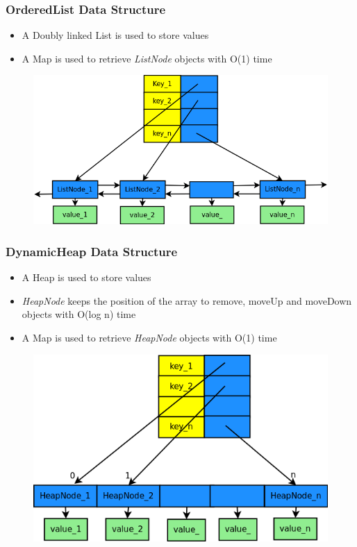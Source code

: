 \documentclass{beamer}
\begin{document}
\begin{frame}
\frametitle{OrderedList Data Structure}

\begin{itemize}
        \item A Doubly linked List is used to store values
        \item A Map is used to retrieve \textit{ListNode} objects with O(1) time
\end{itemize}

\begin{figure}
        \includegraphics[width=0.7\linewidth]{orderedlist.png}
\end{figure}

\end{frame}

\begin{frame}
\frametitle{DynamicHeap Data Structure}

\begin{itemize}
        \item A Heap is used to store values
        \item \textit{HeapNode} keeps the position of the array to remove, moveUp and moveDown objects with O(log n) time
	\item A Map is used to retrieve \textit{HeapNode} objects with O(1) time
\end{itemize}

\begin{figure}
        \includegraphics[width=0.6\linewidth]{DinamicHeap.png}
\end{figure}

\end{frame}
\end{document}
